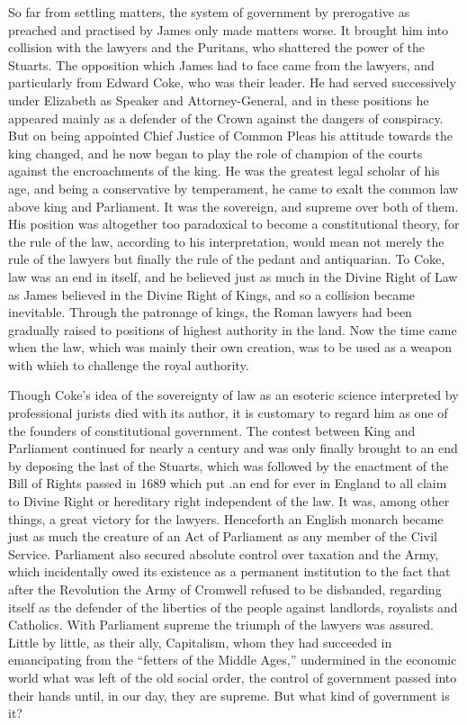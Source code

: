 \documentclass{book}
\begin{document}
So far from settling matters, the system of government by prerogative as preached and practised by James only made matters worse. It brought him into collision with the lawyers and the Puritans, who shattered the power of the Stuarts. The opposition which James had to face came from the lawyers, and particularly from Edward Coke, who was their leader. He had served successively under Elizabeth as Speaker and Attorney-General, and in these positions he appeared mainly as a defender of the Crown against the dangers of conspiracy. But on being appointed Chief Justice of Common Pleas his attitude towards the king changed, and he now began to play the role of champion of the courts against the encroachments of the king. He was the greatest legal scholar of his age, and being a conservative by temperament, he came to exalt the common law above king and Parliament. It was the sovereign, and supreme over both of them. His position was altogether too paradoxical to become a constitutional theory, for the rule of the law, according to his interpretation, would mean not merely the rule of the lawyers but finally the rule of the pedant and antiquarian. To Coke, law was an end in itself, and he believed just as much in the Divine Right of Law as James believed in the Divine Right of Kings, and so a collision became inevitable. Through the patronage of kings, the Roman lawyers had been gradually raised to positions of highest authority in the land. Now the time came when the law, which was mainly their own creation, was to be used as a weapon with which to challenge the royal authority.

Though Coke’s idea of the sovereignty of law as an esoteric science interpreted by professional jurists died with its author, it is customary to regard him as one of the founders of constitutional government. The contest between King and Parliament continued for nearly a century and was only finally brought to an end by deposing the last of the Stuarts, which was followed by the enactment of the Bill of Rights passed in 1689 which put .an end for ever in England to all claim to Divine Right or hereditary right independent of the law. It was, among other things, a great victory for the lawyers. Henceforth an English monarch became just as much the creature of an Act of Parliament as any member of the Civil Service. Parliament also secured absolute control over taxation and the Army, which incidentally owed its existence as a permanent institution to the fact that after the Revolution the Army of Cromwell refused to be disbanded, regarding itself as the defender of the liberties of the people against landlords, royalists and Catholics. With Parliament supreme the triumph of the lawyers was assured. Little by little, as their ally, Capitalism, whom they had succeeded in emancipating from the “fetters of the Middle Ages,” undermined in the economic world what was left of the old social order, the control of government passed into their hands until, in our day, they are supreme. But what kind of government is it?
\end{document}
